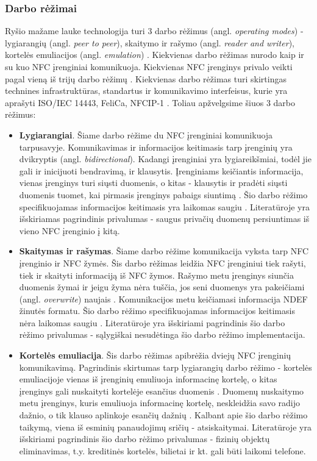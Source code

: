 \subsubsection{Darbo rėžimai}
Ryšio mažame lauke technologija turi 3 darbo rėžimus (angl. \textit{operating modes}) - lygiarangių (angl. \textit{peer to peer}), skaitymo ir rašymo (angl. \textit{reader and writer}), kortelės emuliacijos (angl. \textit{emulation}) \cite{whitepaper2}. Kiekvienas darbo rėžimas nurodo kaip ir su kuo NFC įrenginiai komunikuoja. Kiekvienas NFC įrenginys privalo veikti pagal vieną iš trijų darbo rėžimų \cite{Motlagh2012}. Kiekvienas darbo rėžimas turi skirtingas technines infrastruktūras, standartus ir komunikavimo interfeisus, kurie yra aprašyti ISO/IEC 14443, FeliCa, NFCIP-1 \cite{Leora1980}.
Toliau apžvelgsime šiuos 3 darbo rėžimus:
\begin{itemize}
    \item \textbf{Lygiarangiai}. Šiame darbo rėžime du NFC įrenginiai komunikuoja tarpusavyje. Komunikavimas ir informacijos keitimasis tarp įrenginių yra dvikryptis (angl. \textit{bidirectional}). Kadangi įrenginiai yra lygiareikšmiai, todėl jie gali ir inicijuoti bendravimą, ir klausytis. Įrenginiams keičiantis informacija, vienas įrenginys turi siųsti duomenis, o kitas - klausytis ir pradėti siųsti duomenis tuomet, kai pirmasis įrenginys pabaigs siuntimą \cite{Leora1980}. Šio darbo rėžimo specifikuojamas informacijos keitimasis yra laikomas saugiu \cite{Rahul2015}. Literatūroje \cite{Leora1980} yra išskiriamas pagrindinis privalumas - saugus privačių duomenų persiuntimas iš vieno NFC įrenginio į kitą.
    \item \textbf{Skaitymas ir rašymas}. Šiame darbo rėžime komunikacija vyksta tarp NFC įrenginio ir NFC žymės. Šis darbo rėžimas leidžia NFC įrenginiui tiek rašyti, tiek ir skaityti informaciją iš NFC žymos. Rašymo metu įrenginys siunčia duomenis žymai ir jeigu žyma nėra tuščia, jos seni duomenys yra pakeičiami (angl. \textit{overwrite}) naujais \cite{Leora1980}. Komunikacijos metu keičiamasi informacija NDEF žinutės formatu.  Šio darbo rėžimo specifikuojamas informacijos keitimasis nėra laikomas saugiu \cite{Rahul2015}. Literatūroje \cite{Leora1980} yra išskiriami pagrindinis šio darbo rėžimo privalumas - sąlygiškai nesudėtinga šio darbo rėžimo implementacija.
    \item \textbf{Kortelės emuliacija}. Šis darbo rėžimas apibrėžia dviejų NFC įrenginių komunikavimą. Pagrindinis skirtumas tarp lygiarangių darbo rėžimo - kortelės emuliacijoje vienas iš įrenginių emuliuoja informacinę kortelę, o kitas įrenginys gali nuskaityti kortelėje esančius duomenis \cite{Motlagh2012}. Duomenų nuskaitymo metu įrenginys, kuris emuliuoja informacinę kortelę, neskleidžia savo radijo dažnio, o tik klauso aplinkoje esančių dažnių \cite{Leora1980}. Kalbant apie šio darbo rėžimo taikymą, viena iš esminių panaudojimų sričių - atsiskaitymai. Literatūroje \cite{Leora1980} yra išskiriami pagrindinis šio darbo rėžimo privalumas - fizinių objektų eliminavimas, t.y. kreditinės kortelės, bilietai ir kt. gali būti laikomi telefone.
\end{itemize}

